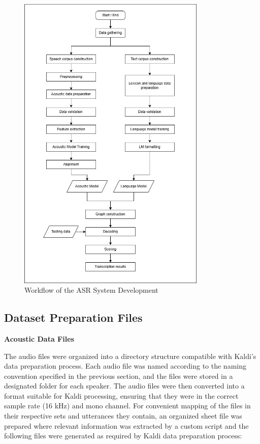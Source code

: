 \begin{figure}[htbp]
   \centering
   \includegraphics[width=0.8\textwidth, keepaspectratio]{./figures/kaldi-pipeline.jpg}
   \caption{Workflow of the ASR System Development}
   \label{fig:kaldi-pipeline}
\end{figure}

\subsection{Dataset Preparation Files}

\textbf{Acoustic Data Files}

The audio files were organized into a directory structure compatible with Kaldi's data preparation process. Each audio file was named according to the naming convention specified in the previous section, and the files were stored in a designated folder for each speaker. The audio files were then converted into a format suitable for Kaldi processing, ensuring that they were in the correct sample rate (16 kHz) and mono channel. For convenient mapping of the files in their respective sets and utterances they contain, an organized sheet file was prepared where relevant information was extracted by a custom script and the following files were generated as required by Kaldi data preparation process:

